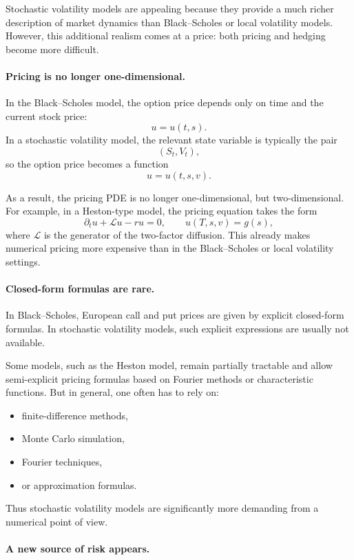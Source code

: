 \documentclass[11pt]{article}
\theoremstyle{plain}
\theoremstyle{definition}
\theoremstyle{remark}
\begin{document}
Stochastic volatility models are appealing because they provide a much
richer description of market dynamics than Black--Scholes or local
volatility models.
However, this additional realism comes at a price: both pricing and
hedging become more difficult.

\paragraph{Pricing is no longer one-dimensional.}

In the Black--Scholes model, the option price depends only on time and
the current stock price:
\[
u=u(t,s).
\]
In a stochastic volatility model, the relevant state variable is
typically the pair
\[
(S_t,V_t),
\]
so the option price becomes a function
\[
u=u(t,s,v).
\]

As a result, the pricing PDE is no longer one-dimensional, but
two-dimensional.
For example, in a Heston-type model, the pricing equation takes the form
\[
\partial_t u+\mathcal L u-r u=0,
\qquad
u(T,s,v)=g(s),
\]
where \(\mathcal L\) is the generator of the two-factor diffusion.
This already makes numerical pricing more expensive than in the
Black--Scholes or local volatility settings.

\paragraph{Closed-form formulas are rare.}

In Black--Scholes, European call and put prices are given by explicit
closed-form formulas.
In stochastic volatility models, such explicit expressions are usually
not available.

Some models, such as the Heston model, remain partially tractable and
allow semi-explicit pricing formulas based on Fourier methods or
characteristic functions.
But in general, one often has to rely on:
\begin{itemize}[leftmargin=1.4em]
    \item finite-difference methods,
    \item Monte Carlo simulation,
    \item Fourier techniques,
    \item or approximation formulas.
\end{itemize}

Thus stochastic volatility models are significantly more demanding from
a numerical point of view.

\paragraph{A new source of risk appears.}
\end{document}
